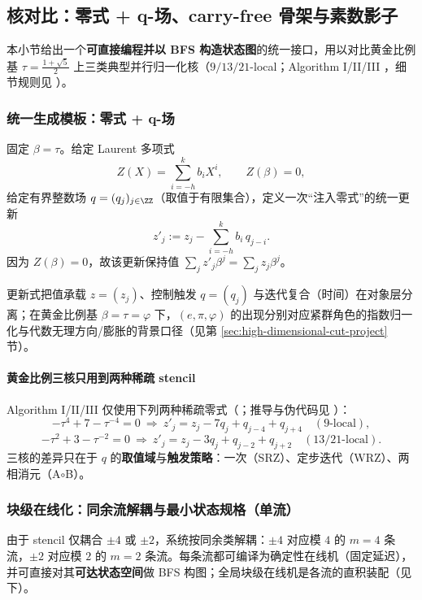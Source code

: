 \subsection{核对比：零式 + q-场、carry-free 骨架与素数影子}\label{sec:A-kernel-compare-main}
本小节给出一个\textbf{可直接编程并以 BFS 构造状态图}的统一接口，用以对比黄金比例基 $\tau=\frac{1+\sqrt5}{2}$ 上三类典型并行归一化核（$9/13/21$-local；Algorithm I/II/III \cite{SvobodovaAAMPVIIIParallelAddition}，细节规则见 \cite{FrougnyHellerPelantovaSvobodovaParallelAlgorithmsSlides}）。

\subsubsection{统一生成模板：零式 + q-场}
固定 $\beta=\tau$。给定 Laurent 多项式
\[
Z(X)=\sum_{i=-h}^{k} b_i X^i,\qquad Z(\beta)=0,
\]
给定有界整数场 $q=(q_j)_{j\in\ZZ}$（取值于有限集合），定义一次“注入零式”的统一更新
\[
z'_j:=z_j-\sum_{i=-h}^{k} b_i\,q_{j-i}.
\]
因为 $Z(\beta)=0$，故该更新保持值 $\sum_j z'_j\beta^j=\sum_j z_j\beta^j$。

\begin{remark}\label{rem:z-q-iter-epi-phi}
更新式把值承载 \(z=(z_j)\)、控制触发 \(q=(q_j)\) 与迭代复合（时间）在对象层分离；在黄金比例基 \(\beta=\tau=\varphi\) 下，\((e,\pi,\varphi)\) 的出现分别对应紧群角色的指数归一化与代数无理方向/膨胀的背景口径（见第 \ref{sec:high-dimensional-cut-project} 节）。
\end{remark}

\paragraph{黄金比例三核只用到两种稀疏 stencil}
Algorithm I/II/III 仅使用下列两种稀疏零式（\cite{SvobodovaAAMPVIIIParallelAddition}；推导与伪代码见 \cite{FrougnyHellerPelantovaSvobodovaParallelAlgorithmsSlides}）：
\[
-\tau^4+7-\tau^{-4}=0\ \Rightarrow\ z'_j=z_j-7q_j+q_{j-4}+q_{j+4}\quad (9\text{-local}),
\]
\[
-\tau^2+3-\tau^{-2}=0\ \Rightarrow\ z'_j=z_j-3q_j+q_{j-2}+q_{j+2}\quad (13/21\text{-local}).
\]
三核的差异只在于 $q$ 的\textbf{取值域}与\textbf{触发策略}：一次（SRZ）、定步迭代（WRZ）、两相消元（A$\circ$B）。

\subsubsection{块级在线化：同余流解耦与最小状态规格（单流）}
由于 stencil 仅耦合 $\pm 4$ 或 $\pm 2$，系统按同余类解耦：$\pm 4$ 对应模 $4$ 的 $m=4$ 条流，$\pm 2$ 对应模 $2$ 的 $m=2$ 条流。每条流都可编译为确定性在线机（固定延迟），并可直接对其\textbf{可达状态空间}做 BFS 构图；全局块级在线机是各流的直积装配（见下）。


